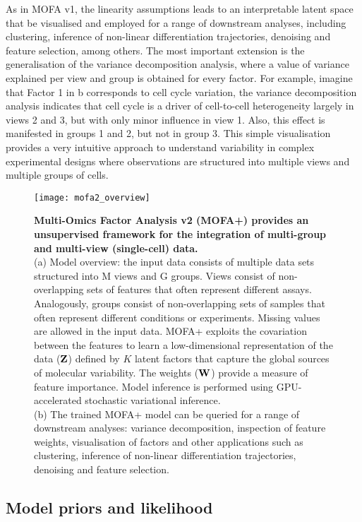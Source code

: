 As in MOFA v1, the linearity assumptions leads to an interpretable latent space that be visualised and employed for a range of downstream analyses, including clustering, inference of non-linear differentiation trajectories, denoising and feature selection, among others. The most important extension is the generalisation of the variance decomposition analysis, where a value of variance explained per view and group is obtained for every factor. For example, imagine that Factor 1 in b corresponds to cell cycle variation, the variance decomposition analysis indicates that cell cycle is a driver of cell-to-cell heterogeneity largely in views 2 and 3, but with only minor influence in view 1. Also, this effect is manifested in groups 1 and 2, but not in group 3. This simple visualisation provides a very intuitive approach to understand variability in complex experimental designs where observations are structured into multiple views and multiple groups of cells.

\begin{figure}[H]
	\centering
	\texttt{[image: mofa2\_overview]}
	\caption[]{\textbf{Multi-Omics Factor Analysis v2 (MOFA+) provides an unsupervised framework for the integration of multi-group and multi-view (single-cell) data.}\\
	(a) Model overview: the input data consists of multiple data sets structured into M views and G groups. Views consist of non-overlapping sets of features that often represent different assays. Analogously, groups consist of non-overlapping sets of samples that often represent different conditions or experiments. Missing values are allowed in the input data. MOFA+ exploits the covariation between the features to learn a low-dimensional representation of the data (${\bf Z}$) defined by $K$ latent factors that capture the global sources of molecular variability. The weights (${\bf W}$) provide a measure of feature importance. Model inference is performed using GPU-accelerated stochastic variational inference. \\
	(b) The trained MOFA+ model can be queried for a range of downstream analyses: variance decomposition, inspection of feature weights, visualisation of factors and other applications such as clustering, inference of non-linear differentiation trajectories, denoising and feature selection.
	}
	\label{fig:mofa2_overview}
\end{figure}


\subsection{Model priors and likelihood}

